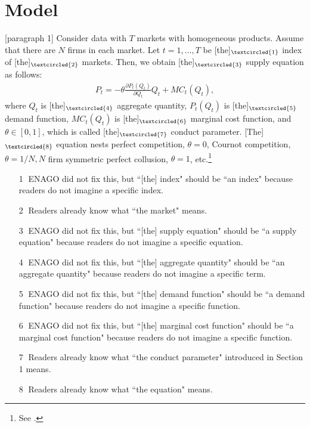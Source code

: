 \documentclass[11pt, a4paper]{article}
\begin{document}
\newpage
\section{Model}
[paragraph 1]
Consider data with $T$ markets with homogeneous products.
Assume that there are $N$ firms in each market.
Let $t = 1,\ldots, T$ be [the]$_{\textcircled{1}}$ index of [the]$_{\textcircled{2}}$ markets.
Then, we obtain [the]$_{\textcircled{3}}$ supply equation as follows:
\begin{align}
     P_t = -\theta\frac{\partial P_t(Q_{t})}{\partial Q_{t}}Q_{t} + MC_t(Q_{t}),\label{eq:supply_equation}
\end{align}
where $Q_{t}$ is [the]$_{\textcircled{4}}$ aggregate quantity, $P_t(Q_{t})$ is [the]$_{\textcircled{5}}$ demand function, $MC_{t}(Q_{t})$ is [the]$_{\textcircled{6}}$ marginal cost function, and $\theta\in[0,1]$, which is called [the]$_{\textcircled{7}}$ conduct parameter. 
[The]$_{\textcircled{8}}$ equation nests perfect competition, $\theta=0$, Cournot competition, $\theta=1/N, N$ firm symmetric perfect collusion, $\theta=1$, etc.\footnote{See \cite{bresnahan1982oligopoly}.} 


\begin{itemize}
    \item[\textcircled{1}] ENAGO did not fix this, but ``[the] index" should be ``an index" because readers do not imagine a specific index.
    \item[\textcircled{2}] Readers already know what ``the market"  means.
    \item[\textcircled{3}] ENAGO did not fix this, but ``[the] supply equation" should be ``a supply equation" because readers do not imagine a specific equation.
    \item[\textcircled{4}] ENAGO did not fix this, but ``[the] aggregate quantity" should be ``an aggregate quantity" because readers do not imagine a specific term.
    \item[\textcircled{5}] ENAGO did not fix this, but ``[the] demand function" should be ``a demand function" because readers do not imagine a specific function.
    \item[\textcircled{6}] ENAGO did not fix this, but ``[the] marginal cost function" should be ``a marginal cost function" because readers do not imagine a specific function.
    \item[\textcircled{7}] Readers already know what ``the conduct parameter" introduced in Section 1 means.
    \item[\textcircled{8}] Readers already know what ``the equation"  means.
\end{itemize}
\end{document}
